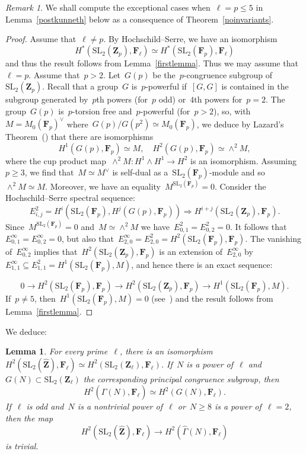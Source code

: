 \documentclass[10pt]{amsart}
\def\Gammah{\widehat{\Gamma}}
\def\Zhat{\widehat{\Z}}
\def\F{\mathbf{F}}
\def\Z{\mathbf{Z}}
\newtheorem{lemma}[subsubsection]{Lemma}
\theoremstyle{remark}
\newtheorem{remark}[subsubsection]{Remark}
\numberwithin{equation}{subsection}
\def\numequation{\addtocounter{subsubsection}{1}\begin{equation}}
\def\SL{\mathrm{SL}}
\begin{document}
\begin{remark} We shall compute the exceptional cases when~$\ell = p \le 5$ in
Lemma~\ref{postkunneth} below
 as a consequence
of Theorem~\ref{noinvariants}.
\end{remark}


\begin{proof}
Assume that~$\ell \ne p$. By Hochschild--Serre, we have an isomorphism
$$H^*(\SL_2(\Z_p),\F_{\ell})  \simeq H^*(\SL_2(\F_p),\F_{\ell})$$
and thus the result follows from Lemma~\ref{firstlemma}.
Thus we may assume that~$\ell = p$.
Assume that~$p > 2$.
Let~$G(p)$ be the~$p$-congruence subgroup of~$\SL_2(\Z_p)$.
Recall that a group~$G$ is~$p$-powerful  if~$[G,G]$ is contained in the subgroup
generated by~$p$th powers (for~$p$ odd) or~$4$th powers for~$p=2$.
The group~$G(p)$ is~$p$-torsion free
and~$p$-powerful (for~$p > 2$), so, with~$M = M_0(\F_p)^{\vee}$ where~$G(p)/G(p^2) \simeq M_0(\F_p)$, we deduce by
Lazard's Theorem~(\cite[Chapter~V, 2.2.6.3 and~2.2.7.2, page~551]{Lazard})
 that there are isomorphisms
$$H^1(G(p),\F_p) \simeq M, \quad H^2(G(p),\F_p) \simeq \wedge^2 M,$$
where the cup product map~$\wedge^2 M: H^1 \wedge H^1 \rightarrow H^2$
is an isomorphism.
Assuming~$p \ge 3$, we find that~$M \simeq M^{\vee}$ is self-dual as a~$\SL_2(\F_p)$-module and so~$\wedge^2 M \simeq M$.
Moreover, we have an equality~$M^{\SL_2(\F_p)} = 0$. Consider the Hochschild--Serre spectral
sequence:
$$E^{2}_{i,j} = H^i(\SL_2(\F_p),H^j(G(p),\F_p)) \Rightarrow H^{i+j}(\SL_2(\Z_p),\F_p).$$
Since~$M^{\SL_2(\F_p)} = 0$ and~$M \simeq \wedge^2 M$ we have~$E^{2}_{0,1} = E^{2}_{0,2} = 0$.
It follows that~$E^{\infty}_{0,1} = E^{\infty}_{0,2} = 0$, but also that~$E^{\infty}_{2,0} = E^{2}_{2,0}
= H^2(\SL_2(\F_p),\F_p)$. 
The vanishing of~$E^{\infty}_{0,2}$ implies that~$H^2(\SL_2(\Z_p),\F_p)$
is an extension of~$E^{\infty}_{2,0}$ by~$E^{\infty}_{1,1} \subseteq E^{2}_{1,1} = H^1(\SL_2(\F_p),M)$,
and hence
there is an exact sequence:
 \numequation
 \label{p3}
 0 \rightarrow H^2(\SL_2(\F_p),\F_p)
\rightarrow H^2(\SL_2(\Z_p),\F_p)
\rightarrow H^1(\SL_2(\F_p),M).
\end{equation}
If~$p \ne 5$, then~$H^1(\SL_2(\F_p),M)=0$ (see~\cite[Lemma~2.48]{DDT}) and the result follows from Lemma~\ref{firstlemma}.
\end{proof}

We deduce:

\begin{lemma} \label{mapiszero}  For every prime~$\ell$, there is an isomorphism~$H^2(\SL_2(\Zhat),\F_{\ell})
\simeq H^2(\SL_2(\Z_{\ell}),\F_{\ell})$. If~$N$ is a power of~$\ell$
and~$G(N) \subset \SL_2(\Z_{\ell})$ the corresponding principal congruence subgroup,
then
$$H^2(\Gammah(N),\F_{\ell}) \simeq H^2(G(N),\F_{\ell}).$$
 If~$\ell$ is odd and~$N$ is a  nontrivial power of~$\ell$ or~$N \ge 8$
is a power of~$\ell = 2$, then the map
$$H^2(\SL_2(\Zhat),\F_{\ell}) \rightarrow H^2(\Gammah(N),\F_{\ell})$$
is trivial.
\end{lemma}
\end{document}
